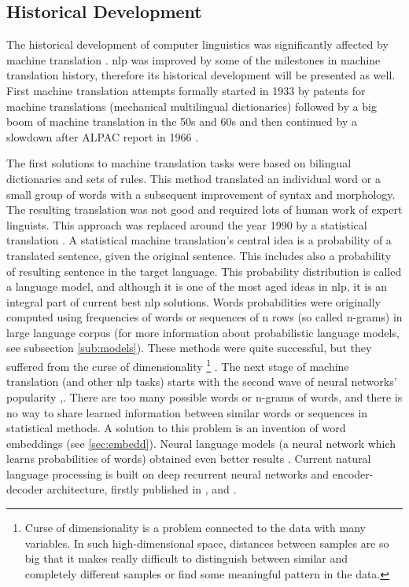 \subsection{Historical Development}
The historical development of computer linguistics was significantly affected by machine translation \citep{Wilks}. \acrshort{nlp} was improved by some of the milestones in machine translation history, therefore its historical development will be presented as well. First machine translation attempts formally started in 1933 by patents for machine translations (mechanical multilingual dictionaries) \citep{Hutchins}
followed by a big boom of machine translation in the 50s and 60s and then continued by a slowdown after ALPAC report in 1966 \citep{Hutchins1996}. 

The first solutions to machine translation tasks were based on bilingual dictionaries and sets of rules. This method translated an individual word or a small group of words with a subsequent improvement of syntax and morphology. The resulting translation was not good and required lots of human work of expert linguists. This approach was replaced around the year 1990 by a statistical translation \citep{Brown}. A statistical machine translation's central idea is a probability of a translated sentence, given the original sentence. This includes also a probability of resulting sentence in the target language. This probability distribution is called a language model, and although it is one of the most aged ideas in \acrshort{nlp}, it is an integral part of current best \acrshort{nlp} solutions. Words probabilities were originally computed using frequencies of words or sequences of n rows (so called n-grams) in large language corpus \citep{jurafsky2012natural} (for more information about probabilistic language models, see subsection \ref{sub:models}). These methods were quite successful, but they suffered from the curse of dimensionality \footnote{Curse of dimensionality is a problem connected to the data with many variables. In such high-dimensional space, distances between samples are so big that it makes really difficult to distinguish between similar and completely different samples or find some meaningful pattern in the data.} \citep[p.450]{Goodfellow-et-al-2016}. The next stage of machine translation (and other \acrshort{nlp} tasks) starts with the second wave of neural networks' popularity \citep{Goldberg},\citep{Google}. There are too many possible words or n-grams of words, and there is no way to share learned information between similar words or sequences in statistical methods. A solution to this problem is an invention of word embeddings \citep{Bengio2003} (see \ref{sec:embedd}). Neural language models (a neural network which learns probabilities of words) obtained even better results \citep{Schwenk2006}. Current natural language processing is built on deep recurrent neural networks and encoder-decoder architecture, firstly published in \citep{Cho2014}, \citep{Sutskever2014} and \citep{Wu2016}. 
